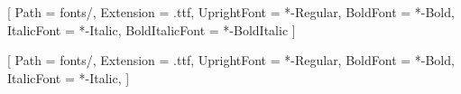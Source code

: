 \usepackage{fontspec}

\setmainfont{LibertinusSerif}[
    Path = fonts/,
    Extension = .ttf,
    UprightFont = *-Regular,
    BoldFont = *-Bold,
    ItalicFont = *-Italic,
    BoldItalicFont = *-BoldItalic
]

\setsansfont{LibertinusSans}[
    Path = fonts/,
    Extension = .ttf,
    UprightFont = *-Regular,
    BoldFont = *-Bold,
    ItalicFont = *-Italic,
]



\usepackage[
  top=1.25in,       %
  bottom=1.5in,     %
  left=1.5in,       %
  right=1.5in,      %
  footskip=1.08in,  %
]{geometry}


\usepackage{setspace}


\usepackage[automark]{scrlayer-scrpage}



\makeatletter
\chead{\textls[100]{\MakeUppercase{\@title\ \textendash\ \headmark}}}
\makeatother

\pagestyle{scrheadings}

\usepackage[splitrule]{footmisc}


\addtolength{\footnotesep}{0.3\baselineskip}
